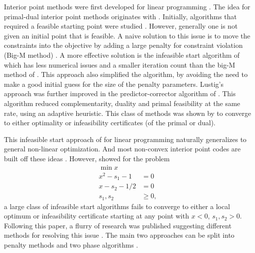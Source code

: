 \documentclass{article}
\begin{document}
Interior point methods were first developed for linear programming \cite{karmarkar1984new}. The idea for primal-dual interior point methods originates with \cite{megiddo1989pathways}. Initially, algorithms that required a feasible starting point were studied \cite{kojima1989primal,monteiro1989interior}. However, generally one is not given an initial point that is feasible. A naive solution to this issue is to move the constraints into the objective  by adding a large penalty for constraint violation (Big-M method) \cite{mcshane1989implementation}. A more effective solution is the infeasible start algorithm of \cite{lustig1990feasibility} which has less numerical issues and a smaller iteration count than the big-M method of \cite{mcshane1989implementation}. This approach also simplified the algorithm, by avoiding the need to make a good initial guess for the size of the penalty parameters. Lustig's approach was further improved in the predictor-corrector algorithm of \cite{mehrotra1992implementation}. This algorithm reduced complementarity, duality and primal feasibility at the same rate, using an adaptive heuristic. This class of methods was shown by \cite{todd2003detecting} to converge to either optimality or infeasibility certificates (of the primal or dual). 


This infeasible start approach of \cite{lustig1990feasibility} for linear programming naturally generalizes to general non-linear optimization. 
And most non-convex interior point codes are built off these ideas \cite{vanderbei1999loqo,wachter2006implementation,byrd2006knitro}. However, \cite{wachter2000failure} showed for the problem
\begin{subequations}\label{failure-ex}
\begin{flalign}
\min { x }\\
x^2 - s_1 - 1 &= 0 \\
x - s_2 - 1/2 &= 0 \\
s_1, s_2 &\ge 0,
\end{flalign}
\end{subequations}
a large class of infeasible start algorithms fails to converge to either a local optimum or infeasibility certificate starting at any point with $x < 0$, $s_{1}, s_{2} > 0$. Following this paper, a flurry of research was published suggesting different methods for resolving this issue \cite{benson2004interior}. The main two approaches can be split into penalty methods \cite{liu2004robust, chen2006interior,curtis2012penalty,gould2015interior} and two phase algorithms \cite{wachter2006implementation}. 
\end{document}
